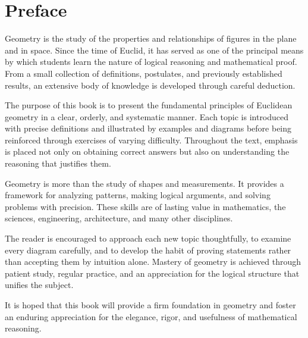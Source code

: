 \chapter{Preface}

Geometry is the study of the properties and relationships of figures in the plane and in space. Since the time of Euclid, it has served as one of the principal means by which students learn the nature of logical reasoning and mathematical proof. From a small collection of definitions, postulates, and previously established results, an extensive body of knowledge is developed through careful deduction.

The purpose of this book is to present the fundamental principles of Euclidean geometry in a clear, orderly, and systematic manner. Each topic is introduced with precise definitions and illustrated by examples and diagrams before being reinforced through exercises of varying difficulty. Throughout the text, emphasis is placed not only on obtaining correct answers but also on understanding the reasoning that justifies them.

Geometry is more than the study of shapes and measurements. It provides a framework for analyzing patterns, making logical arguments, and solving problems with precision. These skills are of lasting value in mathematics, the sciences, engineering, architecture, and many other disciplines.

The reader is encouraged to approach each new topic thoughtfully, to examine every diagram carefully, and to develop the habit of proving statements rather than accepting them by intuition alone. Mastery of geometry is achieved through patient study, regular practice, and an appreciation for the logical structure that unifies the subject.

It is hoped that this book will provide a firm foundation in geometry and foster an enduring appreciation for the elegance, rigor, and usefulness of mathematical reasoning.
